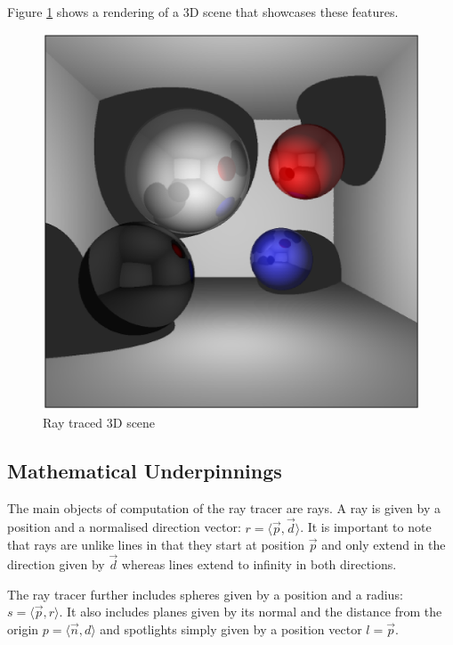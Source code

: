 \documentclass[11pt]{report}
\begin{document}
Figure \ref{raytracerscreenshot} shows a rendering of a 3D scene that showcases these features.

\begin{figure}[ht]
\begin{center}
\includegraphics[scale=0.5]{raytracerscreenshot.eps}
\end{center}
\caption{Ray traced 3D scene}
\label{raytracerscreenshot}
\end{figure}

\subsection{Mathematical Underpinnings}
The main objects of computation of the ray tracer are rays. A ray is given by a position and a normalised direction vector: $r = \langle \vec{p}, \vec{d} \rangle$. It is important to note that rays are unlike lines in that they start at position $\vec{p}$ and only extend in the direction given by $\vec{d}$ whereas lines extend to infinity in both directions.

The ray tracer further includes spheres given by a position and a radius: $s = \langle \vec{p}, r \rangle$. It also includes planes given by its normal and the distance from the origin $p = \langle \vec{n}, d \rangle$ and spotlights simply given by a position vector $l = \vec{p}$.
\end{document}
